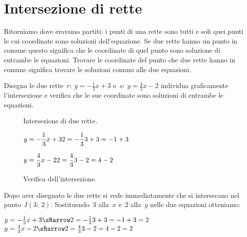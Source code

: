 \section{Intersezione di rette}
\label{sec:retta_intersezionedirette}

Ritorniamo dove eravamo partiti: i punti di una rette sono tutti e soli quei 
punti le cui coordinate sono soluzioni dell'equazione. Se due rette hanno un 
punto in comune questo significa che le coordinate di quel punto sono 
soluzione di entrambe le equazioni. Trovare le coordinate del punto che due 
rette hanno in comune significa trovare le soluzioni comuni alle due equazioni.

\begin{exrig}
 \begin{esempio}
  Disegna le due rette~$r:~y = -\frac{1}{3} x +3$ e~$s:~y = \frac{4}{3} x -2$ 
  individua graficamente l'intersezione e verifica che 
  le sue coordinate sono soluzioni di entrambe le equazioni.
\begin{inaccessibleblock}
 \begin{figure}[h]
 \centering
 \begin{minipage}[]{.60\textwidth}
   \centering
  \caption{Intersezione di due rette.}\label{fig:intersezione01}
 \end{minipage}
 \begin{minipage}[]{.30\textwidth}
  \begin{center}

   $y = -\dfrac{1}{3} x +3 \newline
    2 = -\dfrac{1}{3} 3 +3 = -1 + 3$
   
   $y = \dfrac{4}{3} x -2 \newline
    2 = \dfrac{4}{3} 3 -2 = 4 -2$

  \end{center}
  \caption{Verifica dell'intersezione.}\label{fig:elementi}
 \end{minipage}
\end{figure}
\end{inaccessibleblock}
 \end{esempio}
 
\vspace{-12pt}

Dopo aver disegnato le due rette si vede immediatamente che si intersecano 
nel punto~$I(3;~2)$. Sostituendo~3 alla~$x$ e~2 
alla~$y$ nelle due equazioni otteniamo:

$y = -\frac{1}{3} x +3 \sRarrow
2 = -\frac{1}{3} 3 +3 = -1 + 3 = 2$
\qquad
$y = \frac{4}{3} x -2 \sRarrow
2 = \frac{4}{3} 3 -2 = 4 -2 = 2$
   

\end{exrig}

